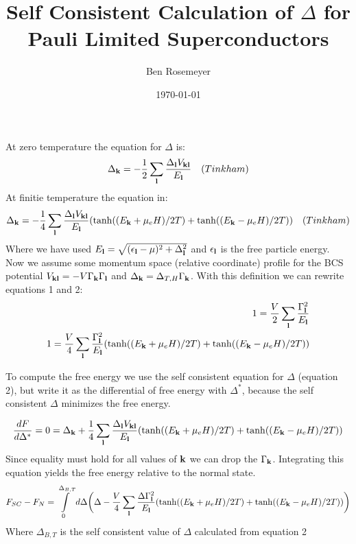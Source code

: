 \documentclass{article}
\begin{document}
\title{Self Consistent Calculation of $\Delta$ for Pauli Limited Superconductors}
\author{Ben Rosemeyer}
\date{\today}
\maketitle

At zero temperature the equation for $\Delta$ is:
\begin{equation}
\Delta_{\bf k}=-\frac{1}{2} \sum\limits_{\bf l} \frac{\Delta_{\bf l} V_{\bf k \bf l}}{E_{\bf l}} \quad (Tinkham)
\end{equation}
At finitie temperature the equation in:
\begin{equation}
\Delta_{\bf k}=-\frac{1}{4} \sum\limits_{\bf l} \frac{\Delta_{\bf l} V_{\bf k \bf l}}{E_{\bf l}}(\tanh((E_{\bf k}+\mu_e H)/2T)+\tanh((E_{\bf k}-\mu_e H)/2T)) \quad (Tinkham)
\end{equation}
Where we have used $E_{\bf l}=\sqrt{ (\epsilon_{\bf l}-\mu)^2 +\Delta_{\bf l}^2}$ and $\epsilon_{\bf l}$ is the free particle energy. Now we assume some momentum space (relative coordinate) profile for the BCS potential $V_{\bf k \bf l}=-V \Gamma_{\bf k} \Gamma_{\bf l}$ and $\Delta_{\bf k}=\Delta_{T,H}\Gamma_{\bf k}$. With this definition we can rewrite equations 1 and 2:
\begin{align}
1=\frac{V}{2} \sum\limits_{\bf l} \frac{\Gamma_{\bf l}^2}{E_{\bf l}} \\
1=\frac{V}{4} \sum\limits_{\bf l} \frac{\Gamma_{\bf l}^2}{E_{\bf l}}(\tanh((E_{\bf k}+\mu_e H)/2T)+\tanh((E_{\bf k}-\mu_e H)/2T))
\end{align}

To compute the free energy we use the self consistent equation for $\Delta$ (equation 2), but write it as the differential of free energy with $\Delta^*$, because the self consistent $\Delta$ minimizes the free energy.

\begin{equation}
\frac{dF}{d\Delta^*}=0=\Delta_{\bf k}+\frac{1}{4} \sum\limits_{\bf l} \frac{\Delta_{\bf l} V_{\bf k \bf l}}{E_{\bf l}}(\tanh((E_{\bf k}+\mu_e H)/2T)+\tanh((E_{\bf k}-\mu_e H)/2T))
\end{equation}
Since equality must hold for all values of $\bf k$ we can drop the $\Gamma_{\bf k}$. Integrating this equation yields the free energy relative to the normal state.
\begin{equation}
F_{SC}-F_N=\int\limits_0^{\Delta_{B,T}} d\Delta \bigg(\Delta-\frac{V}{4} \sum\limits_{\bf l} \frac{\Delta \Gamma_{\bf l}^2}{E_{\bf l}}(\tanh((E_{\bf k}+\mu_e H)/2T)+\tanh((E_{\bf k}-\mu_e H)/2T))\bigg)
\end{equation}
Where $\Delta_{B,T}$ is the self consistent value of $\Delta$ calculated from equation 2
\end{document}
